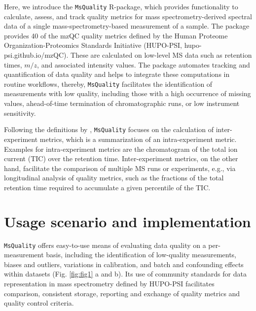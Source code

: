 \documentclass[unnumsec,webpdf,contemporary,large]{oup-authoring-template}%
\theoremstyle{thmstyleone}%
\theoremstyle{thmstyletwo}%
\theoremstyle{thmstylethree}%
\begin{document}
Here, we introduce the \texttt{MsQuality} R-package, which provides 
functionality to calculate, assess, and track quality metrics for mass 
spectrometry-derived spectral data of a single mass-spectrometry-based 
measurement of a sample. 
The package provides 40 of the mzQC quality metrics defined by
the Human Proteome Organization-Proteomics Standards Initiative (HUPO-PSI,
hupo-psi.github.io/mzQC). These are calculated on low-level MS data
such as retention times, $m/z$, and associated intensity values.
The package automates tracking and quantification of data quality and 
helps to integrate these computations in routine workflows, thereby,
\texttt{MsQuality} facilitates the identification of measurements with low 
quality, including those with a high occurrence of missing values, 
ahead-of-time termination of chromatographic runs, or low instrument sensitivity. 

Following the definitions by \cite{Bittremieux2017}, \texttt{MsQuality}
focuses on the calculation of inter-experiment metrics, which is a
summarization of an intra-experiment metric. Examples for
intra-experiment metrics are the chromatogram of the total ion current (TIC) 
over the retention time. Inter-experiment metrics, on the other hand, 
facilitate the comparison of multiple MS runs or experiments, 
e.g., via longitudinal analysis of quality metrics, such as the
fractions of the total retention time required to accumulate a given
percentile of the TIC.

\section{Usage scenario and implementation} \label{usagescenario}

\texttt{MsQuality} offers easy-to-use means of evaluating data quality on a
per-measurement basis, including the identification of low-quality measurements,
biases and outliers, variations in calibration, and batch and confounding effects within
datasets (Fig. \ref{fig:fig1} a and b). Its use of community standards for data
representation in mass spectrometry defined by HUPO-PSI facilitates comparison, 
consistent
storage, reporting and exchange of quality metrics and quality control criteria.
\end{document}
